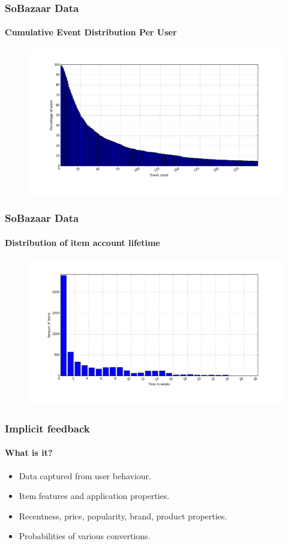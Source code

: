 \documentclass{beamer}
\begin{document}
  \begin{frame}
    \frametitle{SoBazaar Data}
    \framesubtitle{Cumulative Event Distribution Per User}
    \begin{figure}[H]
        \includegraphics[scale=0.3]{../src/image/user_idcumdistribution.png}
        \centering
    \end{figure}
  \end{frame}

  \begin{frame}
    \frametitle{SoBazaar Data}
    \framesubtitle{Distribution of item account lifetime}
    \begin{figure}[H]
        \includegraphics[scale=0.3]{../src/image/itemTimespansdistribution.png}
        \centering
    \end{figure}
  \end{frame}

  \begin{frame}
    \frametitle{Implicit feedback}
    \framesubtitle{What is it?}
    \begin{itemize}
      \item Data captured from user behaviour.
      \item Item features and application properties.
      \item Recentness, price, popularity, brand, product properties.
      \item Probabilities of various convertions.
    \end{itemize}
  \end{frame}
\end{document}
